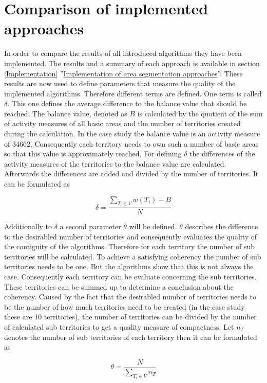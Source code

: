 \section{Comparison of implemented approaches}\label{comparisonapproaches}
In order to compare the results of all introduced algorithms they have been implemented. The results and a summary of each approach is available in section \ref{Implementation} ''\hyperref[Implementation]{Implementation of area segmentation approaches}''. These results are now used to define parameters that measure the quality of the implemented algorithms. Therefore different terms are defined.
One term is called $\delta$. This one defines the average difference to the balance value that should be reached. The balance value, denoted as $B$ is calculated by the quotient of the sum of activity measures of all basic areas and the number of territories created during the calculation. In the case study the balance value is an activity measure of 34662. Consequently each territory needs to own such a number of basic areas so that this value is approximately reached. For defining $\delta$ the differences of the activity measures of the territories to the balance value are calculated. Afterwards the differences are added and divided by the number of territories. It can be formulated as

\[ \mathit{\delta  = \frac{\sum\nolimits  _{T_{i} \in V} w(T_{i})-B}{N}}\]

Additionally to $\delta$ a second parameter $ \theta $ will be defined. $\theta$ describes the difference to the desirabled number of territories and consequently evaluates the quality of the contiguity of the algorithms. Therefore for each territory the number of sub territories will be calculated. To achieve a satisfying coherency the number of sub territories needs to be one. But the algorithms show that this is not always the case. Consequently each territory can be evaluate concerning the sub territories. These territories can be summed up to determine a conclusion about the coherency. Caused by the fact that the desirabled number of territories needs to be the number of how much territories need to be created (in the case study these are 10 territories), the number of territories can be divided by the number of calculated sub territories to get a quality measure of compactness. Let $n_{T}$ denotes the number of sub territories of each territory then it can be formulated as

\[ \mathit{\theta  = \frac{N}{\sum\nolimits  _{T_{i} \in V} n_{T}}}\]

